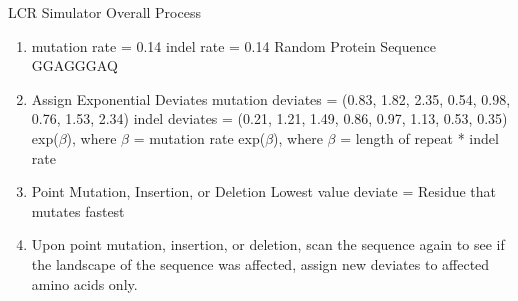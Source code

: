 \documentclass{beamer}
\begin{document}
	\begin{frame}{LCR Simulator Overall Process}
		\begin{center}
			\begin{enumerate}
			\item mutation rate = 0.14
				indel rate = 0.14 \newline
				Random Protein Sequence \newline	
				GGAGGGAQ \newline\pause	
				
				\item Assign Exponential Deviates \newline
				mutation deviates = (0.83, 1.82, 2.35, 0.54, 0.98, 0.76, 1.53, 2.34) \newline
				indel deviates = (0.21, 1.21, 1.49, 0.86, 0.97, 1.13, 0.53, 0.35) \newline
				\qquad exp($\beta$), where $\beta$ = mutation rate\newline 
				\qquad exp($\beta$), where $\beta$ = length of repeat * indel rate \newline \pause
				
				\item Point Mutation, Insertion, or Deletion \newline
				Lowest value deviate = Residue that mutates fastest \newline \pause
				
				\item Upon point mutation, insertion, or deletion, scan the sequence again to see if the landscape of the sequence was affected, assign new deviates to affected amino acids only.
				
			\end{enumerate}
		\end{center}	
	\end{frame}
\end{document}
